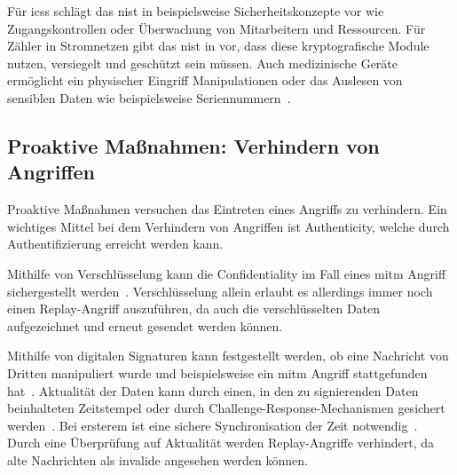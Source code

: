 \documentclass[final,bibliography=totocnumbered]{include/sikseminar}
\begin{document}
Für \glspl{ics} schlägt das \gls{nist} in \cite{SPL+15} beispielsweise Sicherheitskonzepte vor wie Zugangskontrollen oder Überwachung von Mitarbeitern und Ressourcen.
Für Zähler in Stromnetzen gibt das \gls{nist} in \cite{PB14} vor, dass diese kryptografische Module nutzen, versiegelt und geschützt sein müssen.
Auch medizinische Geräte ermöglicht ein physischer Eingriff Manipulationen oder das Auslesen von sensiblen Daten wie beispielsweise Seriennummern~\cite{HLL+17}.



\subsection{Proaktive Maßnahmen: Verhindern von Angriffen}\label{subsec:proactive}
Proaktive Maßnahmen versuchen das Eintreten eines Angriffs zu verhindern.
Ein wichtiges Mittel bei dem Verhindern von Angriffen ist Authenticity, welche durch Authentifizierung erreicht werden kann.

Mithilfe von Verschlüsselung kann die Confidentiality im Fall eines \gls{mitm} Angriff sichergestellt werden~\cite{HLL+17}.
Verschlüsselung allein erlaubt es allerdings immer noch einen Replay-Angriff auszuführen, da auch die verschlüsselten Daten aufgezeichnet und erneut gesendet werden können.

Mithilfe von digitalen Signaturen kann festgestellt werden, ob eine Nachricht von Dritten manipuliert wurde und beispielsweise ein \gls{mitm} Angriff stattgefunden hat~\cite{CAS08}.
Aktualität der Daten kann durch einen, in den zu signierenden Daten beinhalteten Zeitstempel oder durch Challenge-Response-Mechanismen gesichert werden~\cite{CAS08}.
Bei ersterem ist eine sichere Synchronisation der Zeit notwendig~\cite{CAS08}.
Durch eine Überprüfung auf Aktualität werden Replay-Angriffe verhindert, da alte Nachrichten als invalide angesehen werden können.

\end{document}
